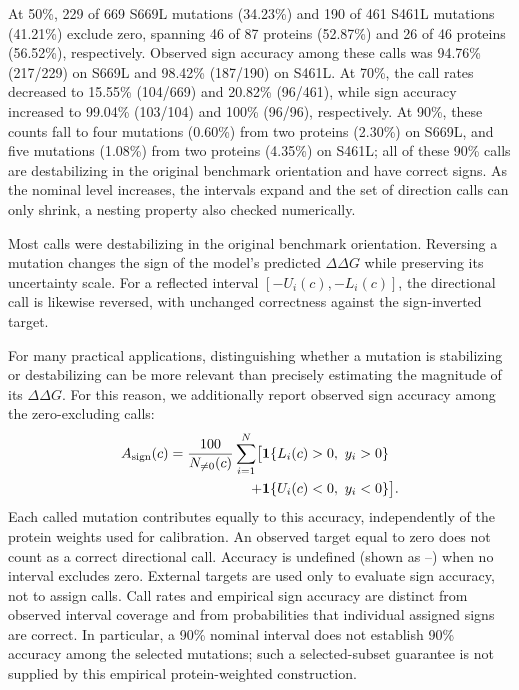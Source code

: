\documentclass[11pt]{article}
\begin{document}
At 50\%, 229 of 669 S669L mutations (34.23\%) and 190 of 461 S461L mutations (41.21\%) exclude zero, spanning 46 of 87 proteins (52.87\%) and 26 of 46 proteins (56.52\%), respectively.
Observed sign accuracy among these calls was 94.76\% (217/229) on S669L and 98.42\% (187/190) on S461L. At 70\%, the call rates decreased to 15.55\% (104/669) and 20.82\% (96/461), while sign accuracy increased to 99.04\% (103/104) and 100\% (96/96), respectively.
At 90\%, these counts fall to four mutations (0.60\%) from two proteins (2.30\%) on S669L, and five mutations (1.08\%) from two proteins (4.35\%) on S461L; all of these 90\% calls are destabilizing in the original benchmark orientation and have correct signs.
As the nominal level increases, the intervals expand and the set of direction calls can only shrink, a nesting property also checked numerically.

Most calls were destabilizing in the original benchmark orientation. Reversing a mutation changes the sign of the model's predicted $\Delta\Delta G$ while preserving its uncertainty scale. For a reflected interval $[-U_i(c),-L_i(c)]$, the directional call is likewise reversed, with unchanged correctness against the sign-inverted target. 

For many practical applications, distinguishing whether a mutation is stabilizing or destabilizing can be more relevant than precisely estimating the magnitude of its \(\Delta\Delta G\). For this reason, we additionally
report observed sign accuracy among the zero-excluding calls:
\begin{equation}
\begin{aligned}
A_{\rm sign}(c)=\frac{100}{N_{\ne0}(c)}\sum_{i=1}^{N}\bigl[
&\mathbf 1\{L_i(c)>0,\ y_i>0\}\\
+{}&\mathbf 1\{U_i(c)<0,\ y_i<0\}\bigr].
\end{aligned}
\end{equation}
Each called mutation contributes equally to this accuracy, independently of the protein weights used for calibration. An observed target equal to zero does not count as a correct directional call. Accuracy is undefined (shown as --) when no interval excludes zero. External targets are used only to evaluate sign accuracy, not to assign calls.
Call rates and empirical sign accuracy are distinct from observed interval coverage and from probabilities that individual assigned signs are correct.
In particular, a 90\% nominal interval does not establish 90\% accuracy among the selected mutations; such a selected-subset guarantee is not supplied by this empirical protein-weighted construction.
\end{document}
